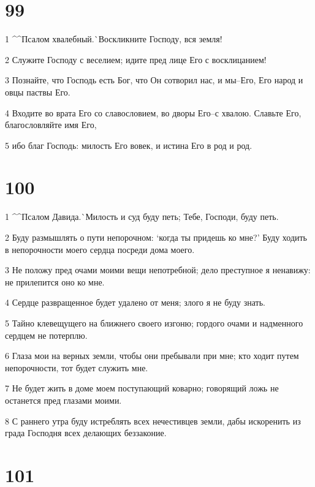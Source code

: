 \chapter{99}

\par 1 ^^Псалом хвалебный.^^ Воскликните Господу, вся земля!
\par 2 Служите Господу с веселием; идите пред лице Его с восклицанием!
\par 3 Познайте, что Господь есть Бог, что Он сотворил нас, и мы--Его, Его народ и овцы паствы Его.
\par 4 Входите во врата Его со славословием, во дворы Его--с хвалою. Славьте Его, благословляйте имя Его,
\par 5 ибо благ Господь: милость Его вовек, и истина Его в род и род.

\chapter{100}

\par 1 ^^Псалом Давида.^^ Милость и суд буду петь; Тебе, Господи, буду петь.
\par 2 Буду размышлять о пути непорочном: `когда ты придешь ко мне?' Буду ходить в непорочности моего сердца посреди дома моего.
\par 3 Не положу пред очами моими вещи непотребной; дело преступное я ненавижу: не прилепится оно ко мне.
\par 4 Сердце развращенное будет удалено от меня; злого я не буду знать.
\par 5 Тайно клевещущего на ближнего своего изгоню; гордого очами и надменного сердцем не потерплю.
\par 6 Глаза мои на верных земли, чтобы они пребывали при мне; кто ходит путем непорочности, тот будет служить мне.
\par 7 Не будет жить в доме моем поступающий коварно; говорящий ложь не останется пред глазами моими.
\par 8 С раннего утра буду истреблять всех нечестивцев земли, дабы искоренить из града Господня всех делающих беззаконие.

\chapter{101}

